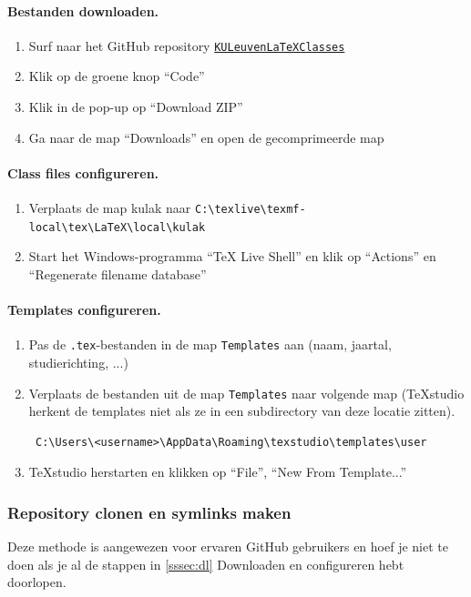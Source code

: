\documentclass[kulak]{kulakarticle} %
\begin{document}
\paragraph{Bestanden downloaden.}
\begin{enumerate}
	\item Surf naar het GitHub repository
	      \href{https://github.com/srebry/KULeuvenLaTeXClasses}{\texttt{KULeuvenLaTeXClasses}}
	\item Klik op de groene knop ``Code''
	\item Klik in de pop-up op ``Download ZIP''
	\item Ga naar de map ``Downloads'' en open de gecomprimeerde map
\end{enumerate}
\paragraph{Class files configureren.}
\begin{enumerate}[resume]
	\item Verplaats de map kulak naar \verb+C:\texlive\texmf-local\tex\LaTeX\local\kulak+
	\item Start het Windows-programma ``TeX Live Shell'' en klik op ``Actions'' en ``Regenerate filename database''
\end{enumerate}
\paragraph{Templates configureren.}
\begin{enumerate}
	\item Pas de \texttt{.tex}-bestanden in de map \texttt{Templates} aan (naam, jaartal, studierichting, ...)
	\item Verplaats de bestanden uit de map \texttt{Templates} naar volgende map (TeXstudio herkent de templates niet als ze in een subdirectory van deze locatie zitten).
	      \begin{verbatim} C:\Users\<username>\AppData\Roaming\texstudio\templates\user
\end{verbatim}
	\item TeXstudio herstarten en klikken op ``File'', ``New From Template...''
\end{enumerate}

\subsubsection{Repository clonen en symlinks maken}
\label{sssec:gh}
Deze methode is aangewezen voor ervaren GitHub gebruikers en hoef je niet te doen als je al de stappen in \ref{sssec:dl} Downloaden en configureren hebt doorlopen.
\end{document}

